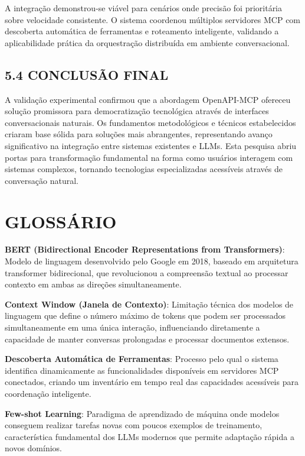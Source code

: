 \documentclass[
]{article}
\begin{document}
A integração demonstrou-se viável para cenários onde precisão foi
prioritária sobre velocidade consistente. O sistema coordenou múltiplos
servidores MCP com descoberta automática de ferramentas e roteamento
inteligente, validando a aplicabilidade prática da orquestração
distribuída em ambiente conversacional.

\subsection{5.4 CONCLUSÃO FINAL}\label{conclusuxe3o-final}

A validação experimental confirmou que a abordagem OpenAPI-MCP ofereceu
solução promissora para democratização tecnológica através de interfaces
conversacionais naturais. Os fundamentos metodológicos e técnicos
estabelecidos criaram base sólida para soluções mais abrangentes,
representando avanço significativo na integração entre sistemas
existentes e LLMs. Esta pesquisa abriu portas para transformação
fundamental na forma como usuários interagem com sistemas complexos,
tornando tecnologias especializadas acessíveis através de conversação
natural.

\section{GLOSSÁRIO}\label{glossuxe1rio}

\textbf{BERT (Bidirectional Encoder Representations from Transformers)}:
Modelo de linguagem desenvolvido pelo Google em 2018, baseado em
arquitetura transformer bidirecional, que revolucionou a compreensão
textual ao processar contexto em ambas as direções simultaneamente.

\textbf{Context Window (Janela de Contexto)}: Limitação técnica dos
modelos de linguagem que define o número máximo de tokens que podem ser
processados simultaneamente em uma única interação, influenciando
diretamente a capacidade de manter conversas prolongadas e processar
documentos extensos.

\textbf{Descoberta Automática de Ferramentas}: Processo pelo qual o
sistema identifica dinamicamente as funcionalidades disponíveis em
servidores MCP conectados, criando um inventário em tempo real das
capacidades acessíveis para coordenação inteligente.

\textbf{Few-shot Learning}: Paradigma de aprendizado de máquina onde
modelos conseguem realizar tarefas novas com poucos exemplos de
treinamento, característica fundamental dos LLMs modernos que permite
adaptação rápida a novos domínios.
\end{document}
